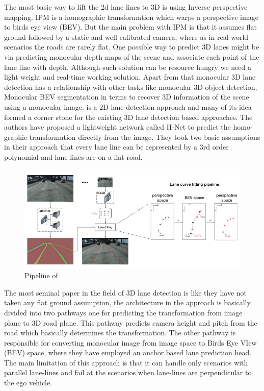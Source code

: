 The most basic way to lift the 2d lane lines to 3D is using Inverse perspective mapping. IPM is a homographic transformation which warps a perspective image to birds eye view (BEV). But the main problem with IPM is that it assumes flat ground followed by a static and well calibrated camera, where as in real world scenarios the roads are rarely flat. One possible way to predict 3D lanes might be via predicting monocular depth maps of the scene and associate each point of the lane line with depth. Although such solution can be resource hungry we need a light weight and real-time working solution. Apart from that monocular 3D lane detection has a relationship with other tasks like monocular 3D object detection, Monocular BEV segmentation in terms to recover 3D information of the scene using a monocular image.
\cite{DBLP:journals/corr/abs-1802-05591} is a 2D lane detection approach and many of its idea formed a corner stone for the existing 3D lane detection based approaches. The authors have proposed a lightweight network called H-Net to predict the homo-graphic transformation directly from the image. They took two basic assumptions in their approach that every lane line can be represented by a 3rd order polynomial and lane lines are on a flat road. 

 \begin{figure}[h]
    \centering
    \includegraphics[width=\textwidth]{images/lanenet.png}
    \caption{Pipeline of \cite{DBLP:journals/corr/abs-1802-05591}}
    \end{figure}


The most seminal paper in the field of 3D lane detection is \cite{DBLP:journals/corr/abs-1811-10203} like \cite{DBLP:journals/corr/abs-1802-05591} they have not taken any flat ground assumption, the architecture in the approach is basically divided into two pathways one for predicting the transformation from image plane to 3D road plane. This pathway predicts camera height and pitch from the road which basically determines the transformation. The other pathway is responsible for converting monocular image from image space to Birds Eye VIew (BEV) space, where they have employed an anchor based lane prediction head. The main limitation of this approach is that it can handle only scenarios with parallel lane-lines and fail at the scenarios when lane-lines are perpendicular to the ego vehicle. 


